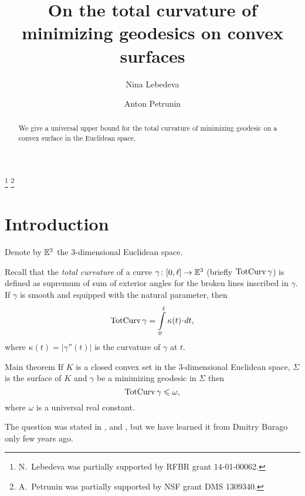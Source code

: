 \documentclass[a4paper,10pt]{amsart}
\begin{document}
\title{On the total curvature of \\
minimizing geodesics on convex surfaces}
\author{Nina Lebedeva}
\address{N. Lebedeva\newline\vskip-4mm
Math. Dept.
St. Petersburg State University,
Universitetsky pr., 28, 
Stary Peterhof, 
198504, Russia.
\newline\vskip-4mm
Steklov Institute,
27 Fontanka, St. Petersburg, 
191023, Russia.}
\author{Anton Petrunin}
\address{A. Petrunin\newline\vskip-4mm
Math. Dept. PSU,
University Park, PA 16802,
USA}
\thanks{N.~Lebedeva was partially supported by RFBR grant 
14-01-00062.}
\thanks{A.~Petrunin was partially supported by NSF grant DMS 1309340.}


\date{}

\begin{abstract}
We give a universal upper bound 
for the total curvature 
of minimizing geodesic 
on a convex surface 
in the Euclidean space.
\end{abstract}
\maketitle

\section{Introduction}


Denote by $\mathbb{E}^3$ the 3-dimensional Euclidean space.

Recall that the \emph{total curvature} of a curve $\gamma\colon[0,\ell]\to \mathbb{E}^3$ 
(briefly $\mathop{\rm TotCurv}\nolimits\gamma$)
is defined as supremum of sum of exterior angles 
for the broken lines inscribed in $\gamma$.
If $\gamma$ is smooth and equipped with the natural parameter, 
then 
\[\tc\gamma=\int\limits_0^\ell \kappa(t)\cdot dt,\]
where $\kappa(t)=|\gamma''(t)|$ is the curvature of $\gamma$ at $t$.

\begin{thm}{Main theorem}\label{thm:main}
If $K$ is a closed convex set in the 3-dimensional Euclidean space,
$\Sigma$ is the surface of $K$ 
and $\gamma$ be a minimizing geodesic in $\Sigma$
then 
\[\mathop{\rm TotCurv}\nolimits\gamma\leqslant \omega,\]
where $\omega$ is a universal real constant.
\end{thm}

The question was stated in \cite{AH-PSV}, \cite{pach} and \cite{BKZ},
but we have learned it from Dmitry Burago only few years ago.
\end{document}
